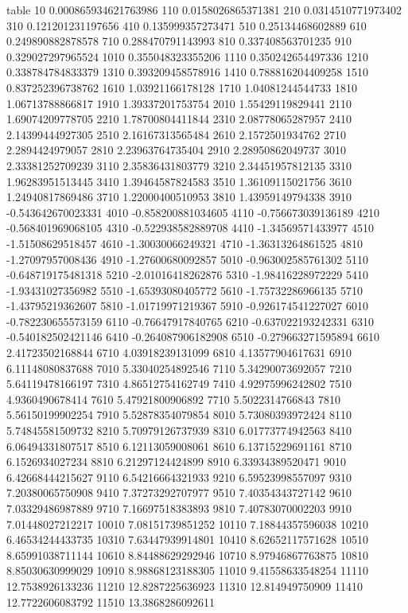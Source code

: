 table {%
10 0.000865934621763986
110 0.0158026865371381
210 0.0314510771973402
310 0.121201231197656
410 0.135999357273471
510 0.25134468602889
610 0.249890882878578
710 0.288470791143993
810 0.337408563701235
910 0.329027297965524
1010 0.355048323355206
1110 0.350242654497336
1210 0.338784784833379
1310 0.393209458578916
1410 0.788816204409258
1510 0.837252396738762
1610 1.03921166178128
1710 1.04081244544733
1810 1.06713788866817
1910 1.39337201753754
2010 1.55429119829441
2110 1.69074209778705
2210 1.78700804411844
2310 2.08778065287957
2410 2.14399444927305
2510 2.16167313565484
2610 2.1572501934762
2710 2.2894424979057
2810 2.23963764735404
2910 2.28950862049737
3010 2.33381252709239
3110 2.35836431803779
3210 2.34451957812135
3310 1.96283951513445
3410 1.39464587824583
3510 1.36109115021756
3610 1.24940817869486
3710 1.22000400510953
3810 1.43959149794338
3910 -0.543642670023331
4010 -0.858200881034605
4110 -0.756673039136189
4210 -0.568401969068105
4310 -0.522938582889708
4410 -1.34569571433977
4510 -1.51508629518457
4610 -1.30030066249321
4710 -1.36313264861525
4810 -1.27097957008436
4910 -1.27600680092857
5010 -0.963002585761302
5110 -0.648719175481318
5210 -2.01016418262876
5310 -1.98416228972229
5410 -1.93431027356982
5510 -1.65393080405772
5610 -1.75732286966135
5710 -1.43795219362607
5810 -1.01719971219367
5910 -0.926174541227027
6010 -0.782230655573159
6110 -0.76647917840765
6210 -0.637022193242331
6310 -0.540182502421146
6410 -0.264087906182908
6510 -0.279663271595894
6610 2.41723502168844
6710 4.03918239131099
6810 4.13577904617631
6910 6.11148080837688
7010 5.33040254892546
7110 5.34290073692057
7210 5.64119478166197
7310 4.86512754162749
7410 4.92975996242802
7510 4.9360490678414
7610 5.47921800906892
7710 5.5022314766843
7810 5.56150199902254
7910 5.52878354079854
8010 5.73080393972424
8110 5.74845581509732
8210 5.70979126737939
8310 6.01773774942563
8410 6.06494331807517
8510 6.12113059008061
8610 6.13715229691161
8710 6.1526934027234
8810 6.21297124424899
8910 6.33934389520471
9010 6.42668444215627
9110 6.54216664321933
9210 6.59523998557097
9310 7.20380065750908
9410 7.37273292707977
9510 7.40354343727142
9610 7.03329486987889
9710 7.16697518383893
9810 7.40783070002203
9910 7.01448027212217
10010 7.08151739851252
10110 7.18844357596038
10210 6.46534244433735
10310 7.63447939914801
10410 8.62652117571628
10510 8.65991038711144
10610 8.84488629292946
10710 8.97946867763875
10810 8.85030630999029
10910 8.98868123188305
11010 9.41558633548254
11110 12.7538926133236
11210 12.8287225636923
11310 12.814949750909
11410 12.7722606083792
11510 13.3868286092611
}
